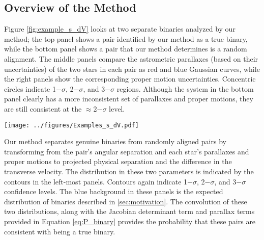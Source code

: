\documentclass[usenatbib]{mnras}
\begin{document}
\subsection{Overview of the Method}


Figure \ref{fig:example_s_dV} looks at two separate binaries analyzed by our method; the top panel shows a pair identified by our method as a true binary, while the bottom panel shows a pair that our method determines is a random alignment. The middle panels compare the astrometric parallaxes (based on their uncertainties) of the two stars in each pair as red and blue Gaussian curves, while the right panels show the corresponding proper motion uncertainties. Concentric circles indicate 1$-\sigma$, 2$-\sigma$, and 3$-\sigma$ regions. Although the system in the bottom panel clearly has a more inconsistent set of parallaxes and proper motions, they are still consistent at the $\approx$2$-\sigma$ level. 


\begin{figure*}
\begin{center}
\texttt{[image: ../figures/Examples\_s\_dV.pdf]}
\caption{We compare the position in $\log s-\log \Delta V$ space of two pairs of stars from the TGAS catalog (black contours) to the expectation of a population of binary stars generated by the method described in Section \ref{sec:motivation} (blue background). The top panel shows a stellar pair identified by our method as a true binary, while the bottom panel shows a stellar pair rejected by our method. The contours, representing 1$-\sigma$, 2$-\sigma$, and 3$-\sigma$ confidence levels are created by accounting for uncertainties in the parallax and proper motions of the stars in each pair. Contours from the pair in the top panel overlap with the region of parameter space expected from genuine binaries, while contours in the bottom panel are clearly disparate. }
\label{fig:example_s_dV}
\end{center}
\end{figure*}


Our method separates genuine binaries from randomly aligned pairs by transforming from the pair's angular separation and each star's parallaxes and proper motions to projected physical separation and the difference in the transverse velocity. The distribution in these two parameters is indicated by the contours in the left-most panels. Contours again indicate 1$-\sigma$, 2$-\sigma$, and 3$-\sigma$ confidence levels. The blue background in these panels is the expected distribution of binaries described in \ref{sec:motivation}. The convolution of these two distributions, along with the Jacobian determinant term and parallax terms provided in Equation \ref{eq:P_binary} provides the probability that these pairs are consistent with being a true binary. 
\end{document}
